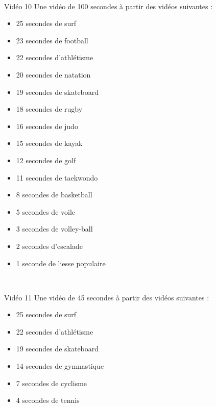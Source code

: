 \documentclass[10pt, a5paper,twoside]{article}
\begin{document}
\vfill

\clearpage
~
\vfill

\begin{card}[width = \textwidth, colback = olympicblue, colframe = olympicblue, bottomtitle = 2mm]{Vidéo 10}
  Une vidéo de 100 secondes à partir des vidéos suivantes :
  \vspace{-5mm}\begin{itemize}
    \item 25 secondes de surf
    \item 23 secondes de football
    \item 22 secondes d'athlétisme
    \item 20 secondes de natation
    \item 19 secondes de skateboard
    \item 18 secondes de rugby
    \item 16 secondes de judo
    \item 15 secondes de kayak
    \item 12 secondes de golf
    \item 11 secondes de taekwondo
    \item 8 secondes de basketball
    \item 5 secondes de voile
    \item 3 secondes de volley-ball
    \item 2 secondes d'escalade
    \item 1 seconde de liesse populaire
  \end{itemize}
\end{card}

\vfill

\clearpage
~
\vfill

\begin{card}[width = \textwidth, colback = olympicgreen, colframe = olympicgreen, bottomtitle = 2mm]{Vidéo 11}
  Une vidéo de 45 secondes à partir des vidéos suivantes :
  \vspace{-1mm}\begin{itemize}
    \item 25 secondes de surf
    \item 22 secondes d'athlétisme
    \item 19 secondes de skateboard
    \item 14 secondes de gymnastique
    \item 7 secondes de cyclisme
    \item 4 secondes de tennis
  \end{itemize}
\end{card}
\end{document}
